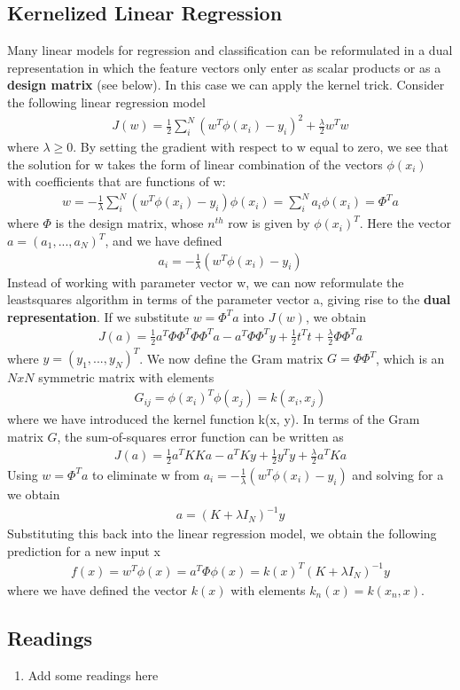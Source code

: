 \documentclass[main]{subfiles}
\begin{document}
\subsection{Kernelized Linear Regression}
Many linear models for regression and classification can be reformulated in a dual representation in which the feature vectors only enter as scalar products or as a \textbf{design matrix} (see below). In this case we can apply the kernel trick.
Consider the following linear regression model
\begin{align}
J(w)=\frac{1}{2} \sum_i^N (w^T \phi(x_i)-y_i)^2 + \frac{\lambda}{2} w^T w
\end{align}
where $\lambda \geq 0$. By setting the gradient with respect to w equal to zero,  we see that the solution for w takes the form of linear combination of the vectors $\phi(x_i)$ with coefficients that are functions of w:
\begin{align}
w=-\frac{1}{\lambda}\sum_i^N(w^T \phi(x_i)-y_i)\phi(x_i)=\sum_i^N a_i \phi(x_i)=\Phi^T a
\end{align}
where $\Phi$ is the design matrix, whose $n^{th}$ row is given by $\phi(x_i)^T$. Here the vector $a=(a_1, ..., a_N)^T$, and we have defined
\begin{align}
a_i=-\frac{1}{\lambda}(w^T \phi(x_i)-y_i)
\end{align}
Instead of working with parameter vector w, we can now reformulate the leastsquares algorithm in terms of the parameter vector a, giving rise to the \textbf{dual representation}. If we substitute $w=\Phi^T a$ into $J(w)$, we obtain
\begin{align}
J(a)=\frac{1}{2}a^T \Phi \Phi^T \Phi \Phi^T a - a^T \Phi \Phi^T y + \frac{1}{2}t^T t + \frac{\lambda}{2} \Phi \Phi^T a
\end{align}
where $y=(y_1,...,y_N)^T$. We now define the Gram matrix $G= \Phi \Phi^T$, which is an $N x N$ symmetric matrix with elements
\begin{align}
G_{ij} = \phi(x_i)^T \phi(x_j)=k(x_i, x_j)
\end{align}
where we have introduced the kernel function k(x, y). In terms of the Gram matrix $G$, the sum-of-squares error function can be written as
\begin{align}
J(a)=\frac{1}{2}a^T KKa - a^T Ky + \frac{1}{2}y^T y + \frac{\lambda}{2}a^T Ka
\end{align}
Using $w=\Phi^T a$ to eliminate w from $a_i=-\frac{1}{\lambda}(w^T \phi(x_i)-y_i)$ and solving for a we obtain
\begin{align}
a=(K + \lambda I_N)^{-1} y
\end{align}
Substituting this back into the linear regression model, we obtain the following prediction for a new input x
\begin{align}
f(x)=w^T \phi(x)=a^T \Phi \phi(x) = k(x)^T (K+\lambda I_N)^{-1} y
\end{align}
where we have defined the vector $k(x)$ with elements $k_n(x) = k(x_n, x)$. 

\subsection{Readings}
\begin{enumerate}
\item Add some readings here
\end{enumerate}
\end{document}
